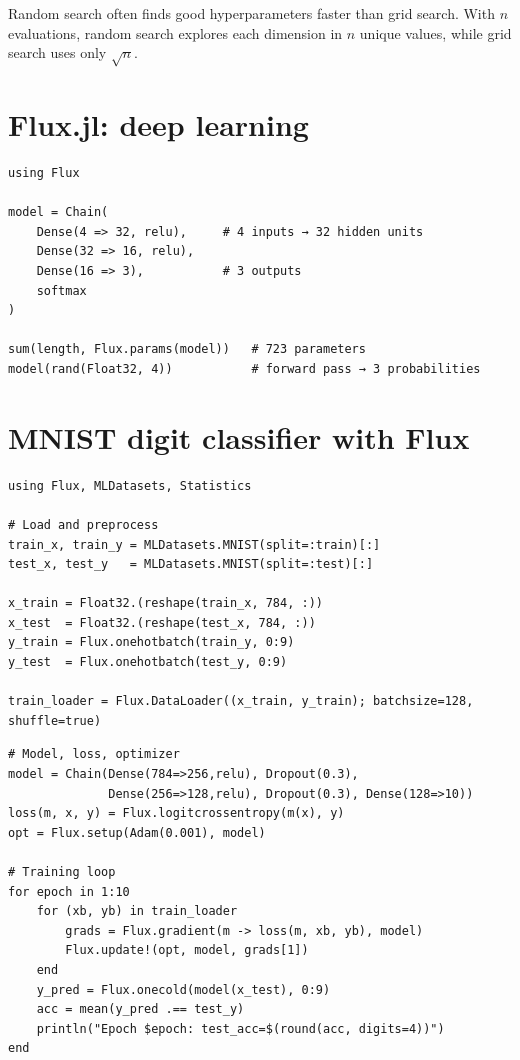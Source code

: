 \begin{juliatip}
Random search often finds good hyperparameters faster than grid search. With $n$ evaluations, random search explores each dimension in $n$ unique values, while grid search uses only $\sqrt{n}$.
\end{juliatip}

\section{Flux.jl: deep learning}

\begin{verbatim}
using Flux

model = Chain(
    Dense(4 => 32, relu),     # 4 inputs → 32 hidden units
    Dense(32 => 16, relu),
    Dense(16 => 3),           # 3 outputs
    softmax
)

sum(length, Flux.params(model))   # 723 parameters
model(rand(Float32, 4))           # forward pass → 3 probabilities
\end{verbatim}

\section{MNIST digit classifier with Flux}

\begin{verbatim}
using Flux, MLDatasets, Statistics

# Load and preprocess
train_x, train_y = MLDatasets.MNIST(split=:train)[:]
test_x, test_y   = MLDatasets.MNIST(split=:test)[:]

x_train = Float32.(reshape(train_x, 784, :))
x_test  = Float32.(reshape(test_x, 784, :))
y_train = Flux.onehotbatch(train_y, 0:9)
y_test  = Flux.onehotbatch(test_y, 0:9)

train_loader = Flux.DataLoader((x_train, y_train); batchsize=128, shuffle=true)
\end{verbatim}

\begin{verbatim}
# Model, loss, optimizer
model = Chain(Dense(784=>256,relu), Dropout(0.3),
              Dense(256=>128,relu), Dropout(0.3), Dense(128=>10))
loss(m, x, y) = Flux.logitcrossentropy(m(x), y)
opt = Flux.setup(Adam(0.001), model)

# Training loop
for epoch in 1:10
    for (xb, yb) in train_loader
        grads = Flux.gradient(m -> loss(m, xb, yb), model)
        Flux.update!(opt, model, grads[1])
    end
    y_pred = Flux.onecold(model(x_test), 0:9)
    acc = mean(y_pred .== test_y)
    println("Epoch $epoch: test_acc=$(round(acc, digits=4))")
end
\end{verbatim}

